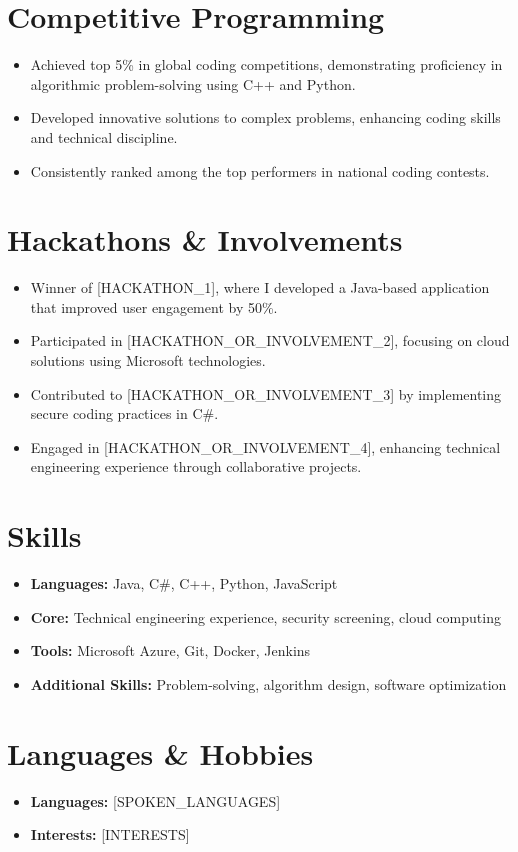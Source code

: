 \documentclass[letterpaper,10.5pt]{article}
\newcommand{\resumeItem}[1]{\item\small{#1}}
\newcommand{\resumeItemListStart}{\begin{itemize}[noitemsep,topsep=0pt,parsep=0pt,partopsep=0pt]}
\newcommand{\resumeItemListEnd}{\end{itemize}}
\begin{document}
\section*{Competitive Programming}
\resumeItemListStart
    \resumeItem{Achieved top 5\% in global coding competitions, demonstrating proficiency in algorithmic problem-solving using C++ and Python.}
    \resumeItem{Developed innovative solutions to complex problems, enhancing coding skills and technical discipline.}
    \resumeItem{Consistently ranked among the top performers in national coding contests.}
\resumeItemListEnd

\section*{Hackathons \& Involvements}
\resumeItemListStart
  \resumeItem{Winner of [HACKATHON_1], where I developed a Java-based application that improved user engagement by 50\%.}
  \resumeItem{Participated in [HACKATHON_OR_INVOLVEMENT_2], focusing on cloud solutions using Microsoft technologies.}
  \resumeItem{Contributed to [HACKATHON_OR_INVOLVEMENT_3] by implementing secure coding practices in C#.}
  \resumeItem{Engaged in [HACKATHON_OR_INVOLVEMENT_4], enhancing technical engineering experience through collaborative projects.}
\resumeItemListEnd

\section{Skills}
\resumeItemListStart
    \resumeItem{\textbf{Languages:} Java, C#, C++, Python, JavaScript}
    \resumeItem{\textbf{Core:} Technical engineering experience, security screening, cloud computing}
    \resumeItem{\textbf{Tools:} Microsoft Azure, Git, Docker, Jenkins}
    \resumeItem{\textbf{Additional Skills:} Problem-solving, algorithm design, software optimization}
\resumeItemListEnd

\section{Languages \& Hobbies}
\resumeItemListStart
    \resumeItem{\textbf{Languages:} [SPOKEN_LANGUAGES]}
    \resumeItem{\textbf{Interests:} [INTERESTS]}
\resumeItemListEnd
\end{document}
